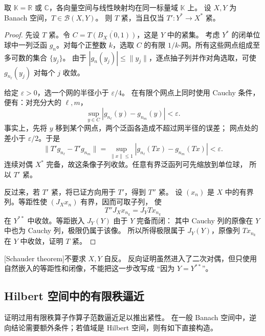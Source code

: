 \begin{theorem}[Schauder]\label{b1:thm:C1-schauder}
取 \(\mathbb K=\mathbb R\) 或 \(\mathbb C\)，各向量空间与线性映射均在同一标量域 \(\mathbb K\) 上。
设 \(X,Y\) 为 Banach 空间，\(T\in\mathcal B(X,Y)\)。
则 \(T\) 紧，当且仅当 \(T':Y^*\rightarrow X^*\) 紧。
\end{theorem}
\begin{proof}
先设 \(T\) 紧。令 \(C=\overline{T(B_X(0,1))}\)，这是 \(Y\) 中的紧集。
考虑 \(Y^*\) 的闭单位球中一列泛函 \(g_n\)。对每个正整数 \(k\)，选取 \(C\) 的有限
\(1/k\)-网。所有这些网点组成至多可数的集合 \(\{y_j\}\)。
由于 \(|g_n(y_j)|\leq\|y_j\|\)，逐点抽子列并作对角选取，可使
\(g_{n_\ell}(y_j)\) 对每个 \(j\) 收敛。

给定 \(\varepsilon>0\)，选一个网的半径小于 \(\varepsilon/4\)。
在有限个网点上同时使用 Cauchy 条件，便有：对充分大的 \(\ell,m\)，
\[
 \sup_{y\in C}|g_{n_\ell}(y)-g_{n_m}(y)|<\varepsilon.
\]
事实上，先将 \(y\) 移到某个网点，两个泛函各造成不超过网半径的误差；
网点处的差小于 \(\varepsilon/2\)。于是
\[
 \|T'g_{n_\ell}-T'g_{n_m}\|
 =\sup_{\|x\|\leq1}|g_{n_\ell}(Tx)-g_{n_m}(Tx)|<\varepsilon.
\]
连续对偶 \(X^*\) 完备，故这条像子列收敛。任意有界泛函列可先缩放到单位球，
所以 \(T'\) 紧。

反过来，若 \(T'\) 紧，将已证方向用于 \(T'\)，得到 \(T''\) 紧。
设 \((x_n)\) 是 \(X\) 中的有界列。等距性使 \((J_Xx_n)\) 有界，因而可取子列，
使
\[
 T''J_Xx_{n_k}=J_YTx_{n_k}
\]
在 \(Y^{**}\) 中收敛。等距嵌入 \(J_Y(Y)\) 由于 \(Y\) 完备而闭：
其中 Cauchy 列的原像在 \(Y\) 中也为 Cauchy 列，极限仍属于该像。
所以所得极限属于 \(J_Y(Y)\)，原像列 \(Tx_{n_k}\) 在 \(Y\) 中收敛，证明 \(T\) 紧。
\end{proof}

[Schauder theorem]不要求 \(X,Y\) 自反。
反向证明虽然进入了二次对偶，但只使用自然嵌入的等距性和闭像，不能把这一步改写成
“因为 \(Y=Y^{**}\)”。

\subsection{Hilbert 空间中的有限秩逼近}
\label{b1:subsec:C10203}

证明过用有限秩算子作算子范数逼近足以推出紧性。
在一般 Banach 空间中，逆向结论需要额外条件；若值域是 Hilbert 空间，则有如下直接构造。

